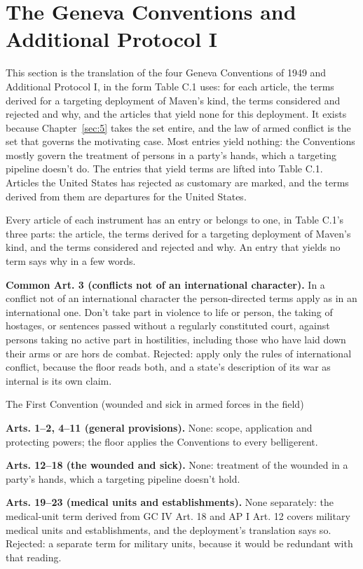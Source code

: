 \section{The Geneva Conventions and Additional Protocol I}
\label{sec:C.2}
This section is the translation of the four Geneva Conventions of 1949 and Additional Protocol I, in the form Table C.1 uses: for each article, the terms derived for a targeting deployment of Maven's kind, the terms considered and rejected and why, and the articles that yield none for this deployment. It exists because Chapter~\ref{sec:5} takes the set entire, and the law of armed conflict is the set that governs the motivating case. Most entries yield nothing: the Conventions mostly govern the treatment of persons in a party's hands, which a targeting pipeline doesn't do. The entries that yield terms are lifted into Table C.1. Articles the United States has rejected as customary are marked, and the terms derived from them are departures for the United States.

Every article of each instrument has an entry or belongs to one, in Table C.1's three parts: the article, the terms derived for a targeting deployment of Maven's kind, and the terms considered and rejected and why. An entry that yields no term says why in a few words.


\textbf{Common Art. 3 (conflicts not of an international character).} In a conflict not of an international character the person-directed terms apply as in an international one. Don't take part in violence to life or person, the taking of hostages, or sentences passed without a regularly constituted court, against persons taking no active part in hostilities, including those who have laid down their arms or are hors de combat. Rejected: apply only the rules of international conflict, because the floor reads both, and a state's description of its war as internal is its own claim.

The First Convention (wounded and sick in armed forces in the field)

\textbf{Arts. 1–2, 4–11 (general provisions).} None: scope, application and protecting powers; the floor applies the Conventions to every belligerent.

\textbf{Arts. 12–18 (the wounded and sick).} None: treatment of the wounded in a party's hands, which a targeting pipeline doesn't hold.

\textbf{Arts. 19–23 (medical units and establishments).} None separately: the medical-unit term derived from GC IV Art. 18 and AP I Art. 12 covers military medical units and establishments, and the deployment's translation says so. Rejected: a separate term for military units, because it would be redundant with that reading.

